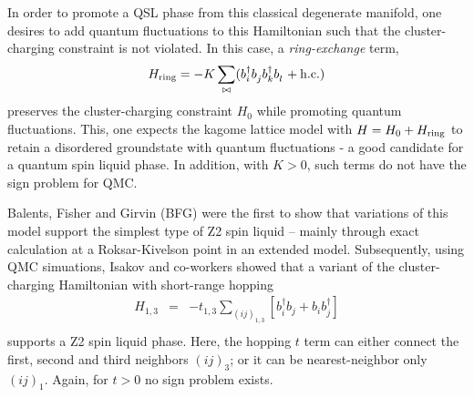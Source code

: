 \documentclass[range]{ar2e}
\begin{document}
In order to promote a QSL phase from this classical degenerate manifold, one desires to add quantum fluctuations to this Hamiltonian such that the cluster-charging constraint is not violated.  In this case, a {\it ring-exchange} term, 
\begin{eqnarray}
H_{\rm ring} = -K \sum_{\bowtie} ( b_i^{\dagger} b_j^{\phantom\dagger} b_k^{\dagger} b_l^{\phantom\dagger} + {\rm h.c.} )
\end{eqnarray} 
preserves the cluster-charging constraint $H_0$ while promoting quantum fluctuations.  This, one expects the kagome lattice model with $H = H_0 + H_{\rm ring}$ to retain a disordered groundstate with quantum fluctuations - a good candidate for a quantum spin liquid phase.  In addition, with $K>0$, such terms do not have the sign problem for QMC.

Balents, Fisher and Girvin\cite{BFG} (BFG) were the first to show that variations of this model support the simplest type of Z2 spin liquid -- mainly through exact calculation at a Roksar-Kivelson point in an extended model.\cite{BFG}  Subsequently, using QMC simuations, Isakov and co-workers showed that a variant of the cluster-charging Hamiltonian with short-range hopping 
\begin{eqnarray}
H_{1,3} &=& -t_{1,3} \sum_{( ij )_{1,3}} [b^{\dagger}_i b_j + b_i b^{\dagger}_j]  \\
\end{eqnarray}
supports a Z2 spin liquid phase.  Here, the hopping $t$ term can either connect the first, second and third neighbors $( ij )_3$; or it can be nearest-neighbor only $( ij )_1$.  Again, for $t>0$ no sign problem exists.


\end{document}
